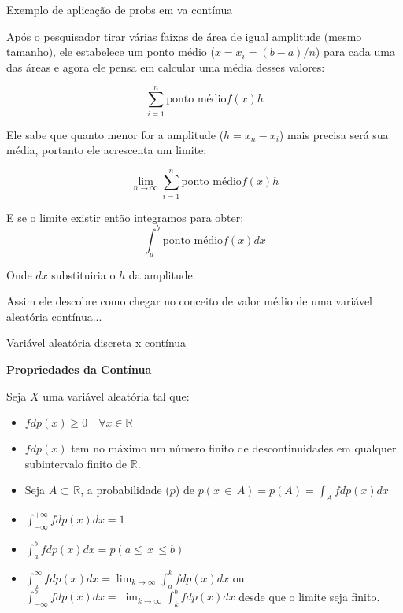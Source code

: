 \documentclass{beamer}
\begin{document}
\begin{frame}{Exemplo de aplicação de probs em va contínua}
\footnotesize

Após o pesquisador tirar várias faixas de área de igual amplitude (mesmo tamanho), ele estabelece um ponto médio ($x=x_{i}=(b-a)/n$) para cada uma das áreas e agora ele pensa em calcular uma média desses valores:

$$
\sum_{i=1}^{n} \mbox{ponto médio}f(x)h
$$

Ele sabe que quanto menor for a amplitude ($h=x_{n}-x_{i}$) mais precisa será sua média, portanto ele acrescenta um limite:

$$
\lim_{n\to \infty}\displaystyle\sum_{i=1}^{n}\mbox{ponto médio}f(x)h
$$

E se o limite existir então integramos para obter:
$$
\displaystyle\int_{a}^{b}\mbox{ponto médio}f(x)dx
$$

Onde $dx$ substituiria o $h$ da amplitude.

Assim ele descobre como chegar no conceito de valor médio de uma variável aleatória contínua...

\end{frame}

\begin{frame}{Variável aleatória discreta x contínua}


\textbf{Propriedades da Contínua}

\footnotesize
Seja $X$ uma variável aleatória tal que:

\begin{itemize}
    \item $fdp(x)\geq 0 \quad \forall x\in \mathbb{R} $
    \item $fdp(x)$ tem no máximo um número finito de descontinuidades em qualquer subintervalo finito de $\mathbb{R}$.
    \item Seja $A \subset \, \mathbb{R}$, a probabilidade ($p$) de $p(x\,\in\, A)=p(A)=\int_{A}fdp(x)dx$
    \item $\displaystyle\int_{-\infty}^{+\infty} fdp(x)dx=1$
    \item $\displaystyle\int_{a}^{b} fdp(x)dx=p(a\leq\,x\,\leq b) $
    \item $\int_{a}^{\infty}fdp(x)dx=\lim_{k\to\infty}\int_{a}^{k}fdp(x)dx$ ou $\int_{-\infty}^{b}fdp(x)dx=\lim_{k\to\infty}\int_{k}^{b}fdp(x)dx$ desde que o limite seja finito.
\end{itemize}
\end{frame}
\end{document}

